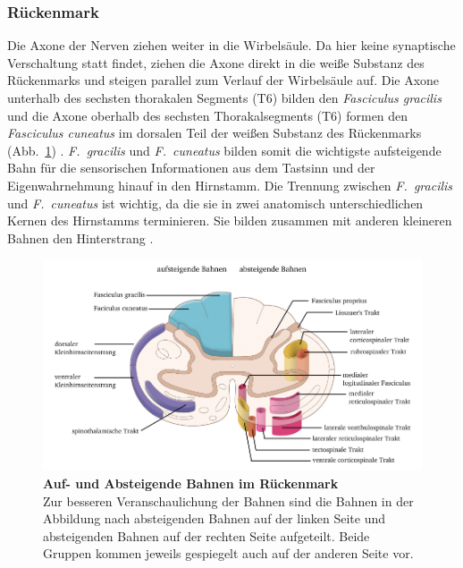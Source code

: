 \documentclass[12pt,a4paper,pdftex]{article}
\begin{document}
\subsubsection*{Rückenmark}
Die Axone der Nerven ziehen weiter in die Wirbelsäule. Da hier keine synaptische Verschaltung statt findet, ziehen die Axone direkt in die weiße Substanz des Rückenmarks und steigen parallel zum Verlauf der Wirbelsäule auf. Die Axone unterhalb des sechsten thorakalen Segments (T6) bilden den \textit{Fasciculus gracilis}  und die Axone oberhalb des sechsten Thorakalsegments (T6) formen den \textit{Fasciculus cuneatus}  im dorsalen Teil der weißen Substanz des Rückenmarks (Abb.~\ref{fig:bahnen_rueckenmark}) \cite[Kap.~8]{paxinos2014rat}. \textit{F.~gracilis} und \textit{F.~cuneatus} bilden somit die wichtigste aufsteigende Bahn für die sensorischen Informationen aus dem Tastsinn und der Eigenwahrnehmung hinauf in den Hirnstamm. 
Die Trennung zwischen \textit{F.~gracilis} und \textit{F.~cuneatus} ist wichtig, da die sie in zwei anatomisch unterschiedlichen Kernen des Hirnstamms terminieren. Sie bilden zusammen mit anderen kleineren Bahnen den Hinterstrang \cite[Kap.~22]{kandel2013principles}. 

\begin{figure}[H]
    \centering
    \includegraphics[width = \textwidth] {pictures/somatosensory/aufabsteigendeBahnen_Rueckenmark.png}
    \caption[Auf- und Absteigende Bahnen im Rückenmark]{\textbf{Auf- und Absteigende Bahnen im Rückenmark}\\ Zur besseren Veranschaulichung der Bahnen sind die Bahnen in der Abbildung nach absteigenden Bahnen auf der linken Seite und absteigenden Bahnen auf der rechten Seite aufgeteilt. Beide Gruppen kommen jeweils gespiegelt auch auf der anderen Seite vor.}
    \label{fig:bahnen_rueckenmark}
\end{figure}
\end{document}
